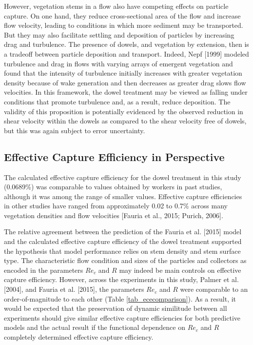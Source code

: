 \documentclass[12pt]{article}
\begin{document}
However, vegetation stems in a flow also have competing effects on particle capture. On one hand, they reduce cross-sectional area of the flow and increase flow velocity, leading to conditions in which more sediment may be transported. But they may also facilitate settling and deposition of particles by increasing drag and turbulence. The presence of dowels, and vegetation by extension, then is a tradeoff between particle deposition and transport. Indeed, Nepf [1999] modeled turbulence and drag in flows with varying arrays of emergent vegetation and found that the intensity of turbulence initially increases with greater vegetation density because of wake generation and then decreases as greater drag slows flow velocities. In this framework, the dowel treatment may be viewed as falling under conditions that promote turbulence and, as a result, reduce deposition. The validity of this proposition is potentially evidenced by the observed reduction in shear velocity within the dowels as compared to the shear velocity free of dowels, but this was again subject to error uncertainty.

\subsection{Effective Capture Efficiency in Perspective}

The calculated effective capture efficiency for the dowel treatment in this study (0.0689\%) was comparable to values obtained by workers in past studies, although it was among the range of smaller values. Effective capture efficiencies in other studies have ranged from approximately 0.02 to 0.7\% across many vegetation densities and flow velocities [Fauria et al., 2015; Purich, 2006].

The relative agreement between the prediction of the Fauria et al. [2015] model and the calculated effective capture efficiency of the dowel treatment supported the hypothesis that model performance relies on stem density and stem surface type. The characteristic flow condition and sizes of the particles and collectors as encoded in the parameters $Re_c$ and $R$ may indeed be main controls on effective capture efficiency. However, across the experiments in this study, Palmer et al. [2004], and Fauria et al. [2015], the parameters $Re_c$ and $R$ were comparable to an order-of-magnitude to each other (Table \ref{tab_ececomparison}). As a result, it would be expected that the preservation of dynamic similitude between all experiments should give similar effective capture efficiencies for both predictive models and the actual result if the functional dependence on $Re_c$ and $R$ completely determined effective capture efficiency.
\end{document}
